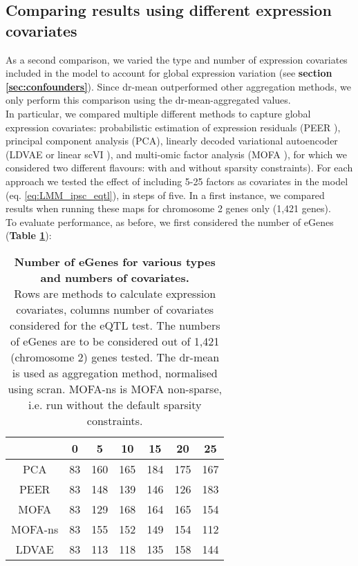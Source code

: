 \subsection{Comparing results using different expression covariates}


As a second comparison, we varied the type and number of expression covariates included in the model to account for global expression variation (see \textbf{section \ref{sec:confounders}}).
Since dr-mean outperformed other aggregation methods, we only perform this comparison using the dr-mean-aggregated values. \\

In particular, we compared multiple different methods to capture global expression covariates: probabilistic estimation of expression residuals (PEER \cite{stegle2010bayesian,stegle2012using}), principal component analysis (PCA), linearly decoded variational autoencoder (LDVAE or linear scVI \cite{svensson2020interpretable}), and multi-omic factor analysis (MOFA \cite{argelaguet2018multi}), for which we considered two different flavours: with and without sparsity constraints).
For each approach we tested the effect of including 5-25 factors as covariates in the model (eq. \eqref{eq:LMM_ipsc_eqtl}), in steps of five.
In a first instance, we compared results when running these maps for chromosome 2 genes only (1,421 genes). \\

To evaluate performance, as before, we first considered the number of eGenes (\textbf{Table \ref{tab:covariates}}):

\begin{table}[h]
    \centering
    \begin{tabular}{c|c c c c c c}
    &          0 & 5 & 10 & 15 & 20 & 25  \\
    \hline
    PCA      & 83 & 160 & 165 & 184 & 175 & 167 \\
    PEER     & 83 & 148 & 139 & 146 & 126 & 183 \\
    MOFA     & 83 & 129 & 168 & 164 & 165 & 154 \\
    MOFA-ns  & 83 & 155 & 152 & 149 & 154 & 112 \\
    LDVAE    & 83 & 113 & 118 & 135 & 158 & 144 \\
    \end{tabular}
    \caption[Number and type of covariate comparison]{\textbf{Number of eGenes for various types and numbers of covariates.}\\
    Rows are methods to calculate expression covariates, columns number of covariates considered for the eQTL test.
    The numbers of eGenes are to be considered out of 1,421 (chromosome 2) genes tested.
    The dr-mean is used as aggregation method, normalised using scran.
    MOFA-ns is MOFA non-sparse, i.e. run without the default sparsity constraints.}
    \label{tab:covariates}
\end{table}

